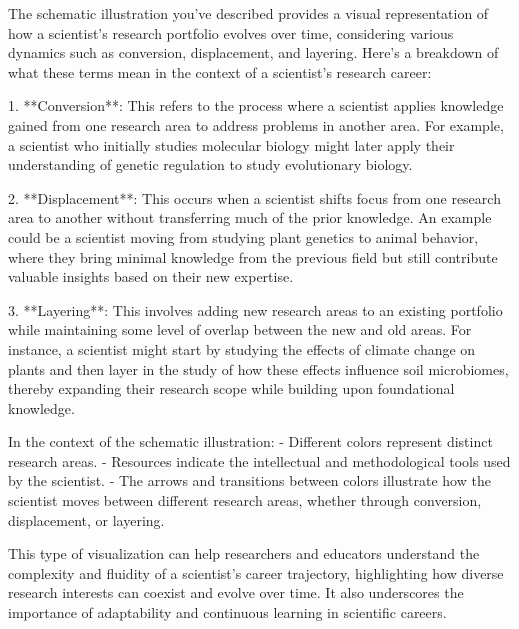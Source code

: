 The schematic illustration you've described provides a visual representation of how a scientist's research portfolio evolves over time, considering various dynamics such as conversion, displacement, and layering. Here’s a breakdown of what these terms mean in the context of a scientist's research career:

1. **Conversion**: This refers to the process where a scientist applies knowledge gained from one research area to address problems in another area. For example, a scientist who initially studies molecular biology might later apply their understanding of genetic regulation to study evolutionary biology.

2. **Displacement**: This occurs when a scientist shifts focus from one research area to another without transferring much of the prior knowledge. An example could be a scientist moving from studying plant genetics to animal behavior, where they bring minimal knowledge from the previous field but still contribute valuable insights based on their new expertise.

3. **Layering**: This involves adding new research areas to an existing portfolio while maintaining some level of overlap between the new and old areas. For instance, a scientist might start by studying the effects of climate change on plants and then layer in the study of how these effects influence soil microbiomes, thereby expanding their research scope while building upon foundational knowledge.

In the context of the schematic illustration:
- Different colors represent distinct research areas.
- Resources indicate the intellectual and methodological tools used by the scientist.
- The arrows and transitions between colors illustrate how the scientist moves between different research areas, whether through conversion, displacement, or layering.

This type of visualization can help researchers and educators understand the complexity and fluidity of a scientist's career trajectory, highlighting how diverse research interests can coexist and evolve over time. It also underscores the importance of adaptability and continuous learning in scientific careers.